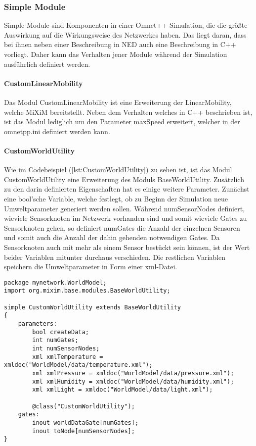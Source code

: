 \subsubsection{Simple Module}

Simple Module sind Komponenten in einer Omnet++ Simulation, die die größte Auswirkung auf die Wirkungsweise des Netzwerkes haben. Das liegt daran, dass bei ihnen neben einer Beschreibung in NED auch eine Beschreibung in C++ vorliegt. Daher kann das Verhalten jener Module während der Simulation ausführlich definiert werden.

\paragraph{CustomLinearMobility}

Das Modul CustomLinearMobility ist eine Erweiterung der LinearMobility, welche MiXiM bereitstellt. Neben dem Verhalten welches in C++ beschrieben ist, ist das Modul lediglich um den Parameter maxSpeed erweitert, welcher in der omnetpp.ini definiert werden kann.

\paragraph{CustomWorldUtility}

Wie im Codebeispiel (\ref{lst:CustomWorldUtility}) zu sehen ist, ist das Modul CustomWorldUtility eine Erweiterung des Moduls BaseWorldUtility. Zusätzlich zu den darin definierten Eigenschaften hat es einige weitere Parameter. Zunächst eine bool'sche Variable, welche festlegt, ob zu Beginn der Simulation neue Umweltparameter generiert werden sollen. \newline Während numSensorNodes definiert, wieviele Sensorknoten im Netzwerk vorhanden sind und somit wieviele Gates zu Sensorknoten gehen, so definiert numGates die Anzahl der einzelnen Sensoren und somit auch die Anzahl der dahin gehenden notwendigen Gates. Da Sensorknoten auch mit mehr als einem Sensor bestückt sein können, ist der Wert beider Variablen mitunter durchaus verschieden.\newline
Die restlichen Variablen speichern die Umweltparameter in Form einer xml-Datei.

\begin{minipage}{\textwidth}
\begin{lstlisting}[language=ned,caption={CustomWorldUtility},label=lst:CustomWorldUtility]
package mynetwork.WorldModel;
import org.mixim.base.modules.BaseWorldUtility;

simple CustomWorldUtility extends BaseWorldUtility
{
    parameters:
        bool createData;
        int numGates;
        int numSensorNodes;
        xml xmlTemperature = xmldoc("WorldModel/data/temperature.xml");
        xml xmlPressure = xmldoc("WorldModel/data/pressure.xml");
        xml xmlHumidity = xmldoc("WorldModel/data/humidity.xml");
        xml xmlLight = xmldoc("WorldModel/data/light.xml");
        
        @class("CustomWorldUtility");
    gates:
        inout worldDataGate[numGates];
        inout toNode[numSensorNodes];
}
\end{lstlisting}
\end{minipage}

